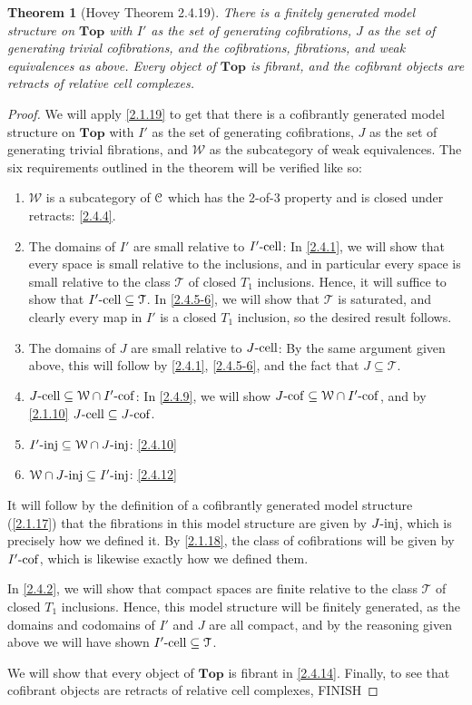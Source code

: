 \documentclass{amsart}
\theoremstyle{plain}
\newtheorem{theorem}{Theorem}[section]
\theoremstyle{definition}
\newcommand{\Top}{\mbf{Top}}
\newcommand{\sseq}{\subseteq}
\newcommand{\0}{\mathbf{0}}
\newcommand{\cC}{\mathcal C}
\newcommand{\cT}{\mathcal T}
\newcommand{\cW}{\mathcal W}
\newcommand{\mbf}[1]{\mathbf{#1}}
\renewcommand{\(}{\left(}
\renewcommand{\)}{\right)}
\def\scr{\EuScript}
\def\cC{\scr{C}}
\newcommand{\inj}{\text-\mathrm{inj}}
\newcommand{\cell}{\text-\mathrm{cell}}
\newcommand{\cof}{\text-\mathrm{cof}}
\begin{document}
\begin{theorem}[Hovey Theorem 2.4.19]\label{2.4.19}
  There is a finitely generated model structure on $\Top$ with $I'$ as the set of generating cofibrations, $J$ as the set of generating trivial cofibrations, and the cofibrations, fibrations, and weak equivalences as above. Every object of $\Top$ is fibrant, and the cofibrant objects are retracts of relative cell complexes.
\end{theorem}
\begin{proof}
  We will apply \autoref{2.1.19} to get that there is a cofibrantly generated model structure on $\Top$ with $I'$ as the set of generating cofibrations, $J$ as the set of generating trivial fibrations, and $\cW$ as the subcategory of weak equivalences. The six requirements outlined in the theorem will be verified like so:
  \begin{enumerate}[label=\arabic*.,noitemsep,topsep=0pt]
    \item $\cW$ is a subcategory of $\cC$ which has the 2-of-3 property and is closed under retracts: \autoref{2.4.4}.
    \item The domains of $I'$ are small relative to $I'\cell$: In \autoref{2.4.1}, we will show that every space is small relative to the inclusions, and in particular every space is small relative to the class $\cT$ of closed $T_1$ inclusions. Hence, it will suffice to show that $I'\cell\sseq\cT$. In \autoref{2.4.5-6}, we will show that $\cT$ is saturated, and clearly every map in $I'$ is a closed $T_1$ inclusion, so the desired result follows.
    \item The domains of $J$ are small relative to $J\cell$: By the same argument given above, this will follow by \autoref{2.4.1}, \autoref{2.4.5-6}, and the fact that $J\sseq\cT$.
    \item $J\cell\sseq\cW\cap I'\cof$: In \autoref{2.4.9}, we will show $J\cof\sseq\cW\cap I'\cof$, and by \autoref{2.1.10} $J\cell\sseq J\cof$.
    \item $I'\inj\sseq\cW\cap J\inj$: \autoref{2.4.10}
    \item $\cW\cap J\inj\sseq I'\inj$: \autoref{2.4.12}
  \end{enumerate}
  It will follow by the definition of a cofibrantly generated model structure (\autoref{2.1.17}) that the fibrations in this model structure are given by $J\inj$, which is precisely how we defined it. By \autoref{2.1.18}, the class of cofibrations will be given by $I'\cof$, which is likewise exactly how we defined them.

  In \autoref{2.4.2}, we will show that compact spaces are finite relative to the class $\cT$ of closed $T_1$ inclusions. Hence, this model structure will be finitely generated, as the domains and codomains of $I'$ and $J$ are all compact, and by the reasoning given above we will have shown $I'\cell\sseq\cT$.
  
  We will show that every object of $\Top$ is fibrant in \autoref{2.4.14}. 
  \color{red}Finally, to see that cofibrant objects are retracts of relative cell complexes, FINISH
\end{proof}
\end{document}
